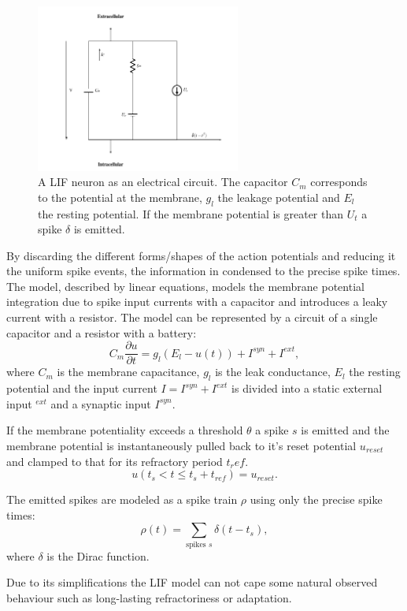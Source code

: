 \begin{figure}
	\centering
    	\includegraphics[width=0.6\textwidth]{imgs/lif.png} 
    \caption{A LIF neuron as an electrical circuit. The capacitor $C_m$ corresponds to the potential at the membrane, $g_l$ the leakage potential and $E_l$ the resting potential. If the membrane potential is greater than $U_t$ a spike $\delta$ is emitted.}
	\label{fig:lif}
\end{figure}

By discarding the different forms/shapes of the action potentials and reducing it the uniform spike events, the information in condensed to the precise spike times.
The model, described by linear equations, models the membrane potential integration due to spike input currents with a capacitor and introduces a leaky current with a resistor. 
The model can be represented by a circuit of a single capacitor and a resistor with a battery:
\[
C_m \frac{\partial u}{\partial t} = g_l ( E_l - u(t) ) + I^{syn} + I^{ext} , 
\]
where $C_m$ is the membrane capacitance, $g_l$ is the leak conductance, $E_l$ the resting potential and the input current $I = I^{syn} + I^{ext}$ is divided into a static external input $^{ext}$ and a synaptic input $I^{syn}$.   

If the membrane potentiality exceeds a threshold $\theta$ a spike $s$ is emitted and the membrane potential is  instantaneously pulled back to it's reset potential $u_{reset}$ and clamped to that for its refractory period $t_ref$.
\[
u(t_{s} < t \le t_{s} + t_{ref}) = u_{reset}.
\]

The emitted spikes are modeled as a spike train $\rho$ using only the precise spike times:
\[
\rho(t) = \sum_{\text{spikes } s} \delta(t-t_s),
\] 
where $\delta$ is the Dirac function.

Due to its simplifications the LIF model can not cape some natural observed behaviour such as long-lasting refractoriness or adaptation. 

